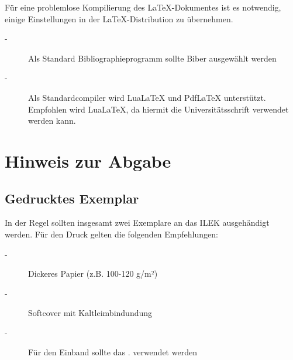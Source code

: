 \vspace{-.5cm}


Für eine problemlose Kompilierung des \LaTeX-Dokumentes ist es notwendig, einige Einstellungen in der LaTeX-Distribution zu übernehmen.

\begin{description}
	\item[-] Als Standard Bibliographieprogramm sollte Biber ausgewählt werden
	\item[-] Als Standardcompiler wird LuaLaTeX und PdfLaTeX unterstützt. Empfohlen wird LuaLaTeX, da hiermit die Universitätsschrift verwendet werden kann.
\end{description}


\section*{Hinweis zur Abgabe}

\subsection*{Gedrucktes Exemplar}

In der Regel sollten insgesamt zwei Exemplare an das ILEK ausgehändigt werden. Für den Druck gelten die folgenden Empfehlungen:

\begin{description}
	\item[-] Dickeres Papier (z.B. 100-120 g/m²)
	\item[-] Softcover mit Kaltleimbindundung
	\item[-] Für den Einband sollte das . verwendet werden 
\end{description}

